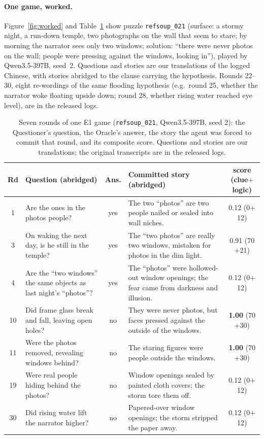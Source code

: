 \documentclass{article}
\begin{document}
\paragraph{One game, worked.} Figure~\ref{fig:worked} and
Table~\ref{tab:game} show puzzle \texttt{refsoup\_021} (surface: a stormy
night, a run-down temple, two photographs on the wall that seem to stare; by
morning the narrator sees only two windows; solution: ``there were never
photos on the wall; people were pressing against the windows, looking in''),
played by Qwen3.5-397B, seed~2. Questions and stories are our translations
of the logged Chinese, with stories abridged to the clause carrying the
hypothesis. Rounds 22--30, eight re-wordings of the same
flooding hypothesis (e.g.\ round 25, whether the narrator woke floating
upside down; round 28, whether rising water reached eye level), are in the
released logs.

\begin{table}[h]
\centering\footnotesize
\begin{tabular}{@{}c p{4.2cm} c p{5.1cm} c@{}}
\toprule
Rd & Question (abridged) & Ans. & Committed story (abridged) & score (clue$+$logic) \\
\midrule
1 & Are the ones in the photos people? & yes & The two ``photos'' are two people nailed or sealed into wall niches. & 0.12 (0$+$12) \\
3 & On waking the next day, is he still in the temple? & yes & The ``two photos'' are really two windows, mistaken for photos in the dim light. & 0.91 (70$+$21) \\
4 & Are the ``two windows'' the same objects as last night's ``photos''? & yes & The ``photos'' were hollowed-out window openings; the fear came from darkness and illusion. & 0.12 (0$+$12) \\
10 & Did frame glass break and fall, leaving open holes? & no & They were never photos, but faces pressed against the outside of the windows. & \textbf{1.00} (70$+$30) \\
11 & Were the photos removed, revealing windows behind? & no & The staring figures were people outside the windows. & \textbf{1.00} (70$+$30) \\
19 & Were real people hiding behind the photos? & no & Window openings sealed by painted cloth covers; the storm tore them off. & 0.12 (0$+$12) \\
30 & Did rising water lift the narrator higher? & no & Papered-over window openings; the storm stripped the paper away. & 0.12 (0$+$12) \\
\bottomrule
\end{tabular}
\caption{Seven rounds of one E1 game (\texttt{refsoup\_021}, Qwen3.5-397B,
seed 2): the Questioner's question, the Oracle's answer, the story the agent
was forced to commit that round, and its composite score. Questions and
stories are our translations; the original transcripts are in the released logs.}
\label{tab:game}
\end{table}
\end{document}
